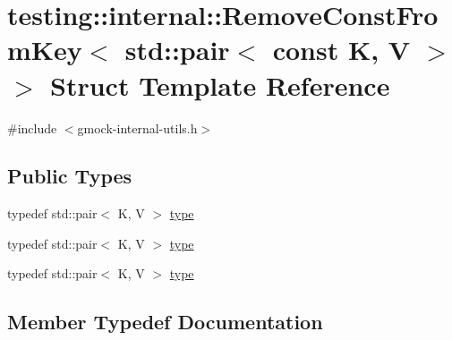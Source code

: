 \hypertarget{structtesting_1_1internal_1_1_remove_const_from_key_3_01std_1_1pair_3_01const_01_k_00_01_v_01_4_01_4}{}\section{testing\+::internal\+::Remove\+Const\+From\+Key$<$ std\+::pair$<$ const K, V $>$ $>$ Struct Template Reference}
\label{structtesting_1_1internal_1_1_remove_const_from_key_3_01std_1_1pair_3_01const_01_k_00_01_v_01_4_01_4}


{\ttfamily \#include $<$gmock-\/internal-\/utils.\+h$>$}

\subsection*{Public Types}
\begin{DoxyCompactItemize}
\item 
typedef std\+::pair$<$ K, V $>$ \mbox{\hyperlink{structtesting_1_1internal_1_1_remove_const_from_key_3_01std_1_1pair_3_01const_01_k_00_01_v_01_4_01_4_ac1d76274964aa8172889a4714246e86f}{type}}
\item 
typedef std\+::pair$<$ K, V $>$ \mbox{\hyperlink{structtesting_1_1internal_1_1_remove_const_from_key_3_01std_1_1pair_3_01const_01_k_00_01_v_01_4_01_4_ac1d76274964aa8172889a4714246e86f}{type}}
\item 
typedef std\+::pair$<$ K, V $>$ \mbox{\hyperlink{structtesting_1_1internal_1_1_remove_const_from_key_3_01std_1_1pair_3_01const_01_k_00_01_v_01_4_01_4_ac1d76274964aa8172889a4714246e86f}{type}}
\end{DoxyCompactItemize}


\subsection{Member Typedef Documentation}
\mbox{\label{structtesting_1_1internal_1_1_remove_const_from_key_3_01std_1_1pair_3_01const_01_k_00_01_v_01_4_01_4_ac1d76274964aa8172889a4714246e86f}} 
